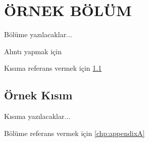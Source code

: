\chapter{ÖRNEK BÖLÜM}
\label{chp:b1}

Bölüme yazılacaklar...

Alıntı yapmak için \cite{Cura}

Kısıma referans vermek için \ref{sec:k1}

\section{Örnek Kısım}
\label{sec:k1}

Kısıma yazılacaklar...

Bölüme referans vermek için \ref{chp:appendixA}